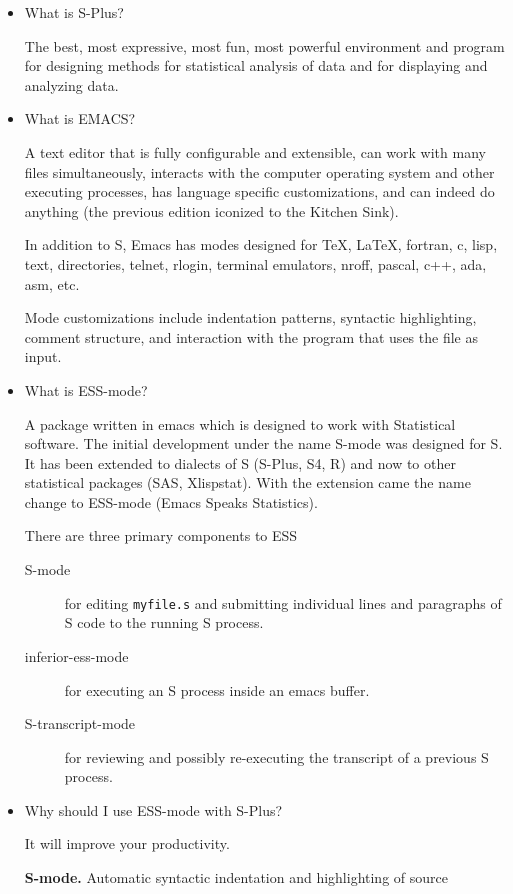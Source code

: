 \documentclass[12pt]{article}   %
\begin{document}
\newpage
\begin{itemize}
\item
What is S-Plus?

The best, most expressive, most fun, most powerful environment and
program for designing methods for statistical analysis of data and for
displaying and analyzing data.

\newpage
\item
What is EMACS?

A text editor that is fully configurable and extensible, can work with
many files simultaneously, interacts with the computer operating
system and other executing processes, has language specific
customizations, and can indeed do anything (the previous edition
iconized to the Kitchen Sink).

In addition to S, Emacs has modes designed for \TeX, \LaTeX, fortran,
c, lisp, text, directories, telnet, rlogin, terminal emulators, nroff,
pascal, c++, ada, asm, etc.

Mode customizations include indentation patterns, syntactic
highlighting, comment structure, and interaction with the program that
uses the file as input.

\newpage
\item
What is ESS-mode?

A package written in emacs which is designed to work with Statistical
software.  The initial development under the name S-mode was designed
for S.  It has been extended to dialects of S (S-Plus, S4, R) and now
to other statistical packages (SAS, Xlispstat).  With the extension
came the name change to ESS-mode (Emacs Speaks Statistics).

There are three primary components to ESS
\begin{description}
\item [S-mode] for editing {\tt myfile.s} and submitting individual
lines and paragraphs of S code to the running S process.
\item [inferior-ess-mode]  for executing an S process inside an emacs buffer.
\item [S-transcript-mode] for reviewing and possibly re-executing the
transcript of a previous S process.
\end{description}


\item
Why should I use ESS-mode with S-Plus?

It will improve your productivity.


\newpage
{\bf S-mode.} Automatic syntactic indentation and highlighting of source
\vspace*{-.5ex}


\end{itemize}
\end{document}
